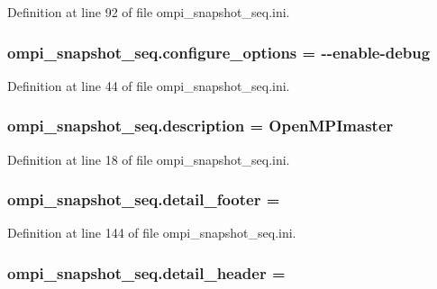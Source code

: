 Definition at line 92 of file ompi\-\_\-snapshot\-\_\-seq.\-ini.

\hypertarget{namespaceompi__snapshot__seq_affb396ef384900a98c5a943dd8817711}{
\subsubsection[{configure\-\_\-options}]{\setlength{\rightskip}{0pt plus 5cm}ompi\-\_\-snapshot\-\_\-seq.\-configure\-\_\-options = -\/-\/enable-\/debug}}\label{namespaceompi__snapshot__seq_affb396ef384900a98c5a943dd8817711}


Definition at line 44 of file ompi\-\_\-snapshot\-\_\-seq.\-ini.

\hypertarget{namespaceompi__snapshot__seq_a918891e52aa1a572f039326981585a7a}{
\subsubsection[{description}]{\setlength{\rightskip}{0pt plus 5cm}ompi\-\_\-snapshot\-\_\-seq.\-description = Open\-M\-P\-Imaster}}\label{namespaceompi__snapshot__seq_a918891e52aa1a572f039326981585a7a}


Definition at line 18 of file ompi\-\_\-snapshot\-\_\-seq.\-ini.

\hypertarget{namespaceompi__snapshot__seq_a0238cbbb945d76de96b90e3cd058d356}{
\subsubsection[{detail\-\_\-footer}]{\setlength{\rightskip}{0pt plus 5cm}ompi\-\_\-snapshot\-\_\-seq.\-detail\-\_\-footer =}}\label{namespaceompi__snapshot__seq_a0238cbbb945d76de96b90e3cd058d356}


Definition at line 144 of file ompi\-\_\-snapshot\-\_\-seq.\-ini.

\hypertarget{namespaceompi__snapshot__seq_aa8131df6b7e79ce54a5832a78a18226b}{
\subsubsection[{detail\-\_\-header}]{\setlength{\rightskip}{0pt plus 5cm}ompi\-\_\-snapshot\-\_\-seq.\-detail\-\_\-header =}}\label{namespaceompi__snapshot__seq_aa8131df6b7e79ce54a5832a78a18226b}


